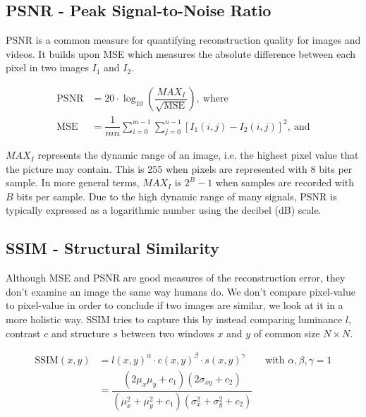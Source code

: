 \subsection{PSNR - Peak Signal-to-Noise Ratio}
PSNR is a common measure for quantifying reconstruction quality for images and videos. It builds upon MSE which measures the absolute difference between each pixel in two images $I_1$ and $I_2$.

\begin{align} 
    \text{PSNR} &= 20 \cdot \log_{10}\left(\dfrac{MAX_I}{\sqrt{\text{MSE}}}\right) \label{eq:psnr}, \ \text{where} \\ 
    \text{MSE} &= \dfrac{1}{m n} \sum_{i = 0}^{m-1} \sum_{j = 0}^{n-1} \left[I_1(i,j) - I_2(i, j) \right]^2, \ \text{and} \label{eq:mse}
\end{align}

$MAX_I$ represents the dynamic range of an image, i.e. the highest pixel value that the picture may contain. This is 255 when pixels are represented with 8 bits per sample. In more general terms, $MAX_I$ is $2^B-1$ when samples are recorded with $B$ bits per sample. Due to the high dynamic range of many signals, PSNR is typically expressed as a logarithmic number using the decibel (dB) scale.

\subsection{SSIM - Structural Similarity}
Although MSE and PSNR are good measures of the reconstruction error, they don't examine an image the same way humans do. We don't compare pixel-value to pixel-value in order to conclude if two images are similar, we look at it in a more holistic way. SSIM tries to capture this by instead comparing luminance $l$, contrast $c$ and structure $s$ between two windows $x$ and $y$ of common size $N \times N$.

\begin{align} \label{eq:ssim}
    \text{SSIM}(x, y) &= l(x,y)^\alpha \cdot c(x,y)^\beta \cdot s(x,y)^\gamma \qquad \text{with } \alpha, \beta, \gamma = 1 \\
    &= \dfrac{(2\mu_x \mu_y + c_1)(2\sigma_{xy} + c_2)}{(\mu_x^2 + \mu_y^2 + c_1)(\sigma_x^2 + \sigma_y^2 + c_2)}
\end{align}

